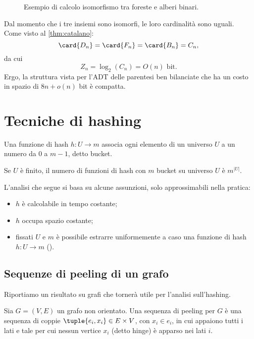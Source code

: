 \begin{figure}[ht]
	\centering
	
	\caption{Esempio di calcolo isomorfismo tra foreste e alberi binari.}
	\label{fig:iso_forest_bintree_example}
\end{figure}

Dal momento che i tre insiemi sono isomorfi, le loro cardinalità sono uguali. Come visto al \cref{thm:catalano}:
\begin{equation*}
	\card{D_n}=\card{F_n}=\card{B_n}=C_n \text,
\end{equation*}
da cui
\begin{equation*}
	Z_n=\log_2(C_n)=O(n) \text{ bit}.
\end{equation*}
Ergo, la struttura vista per l'ADT delle parentesi ben bilanciate che ha un costo in spazio di $8n+o(n)$ bit è compatta.



\section{Tecniche di hashing}
Una funzione di hash $h:U\to m$ associa ogni elemento di un universo $U$ a un numero da $0$ a $m-1$, detto bucket.

Se $U$ è finito, il numero di funzioni di hash con $m$ bucket su universo $U$ è $m^{|U|}$.

L'analisi che segue si basa su alcune assunzioni, solo approssimabili nella pratica:
\begin{itemize}
	\item $h$ è calcolabile in tempo costante;
	\item $h$ occupa spazio costante;
	\item fissati $U$ e $m$ è possibile estrarre uniformemente a caso una funzione di hash $h:U\to m$ ().
\end{itemize}


\subsection{Sequenze di peeling di un grafo}
Riportiamo un risultato su grafi che tornerà utile per l'analisi sull'hashing.

\begin{defin}
	Sia $G=(V,E)$ un grafo non orientato. Una sequenza di peeling per $G$ è una sequenza di coppie $\tuple{e_i,x_i}\in E\times V$, con $x_i\in e_i$, in cui appaiono tutti i lati e tale per cui nessun vertice $x_i$ (detto hinge) è apparso nei lati $i$.
\end{defin}

